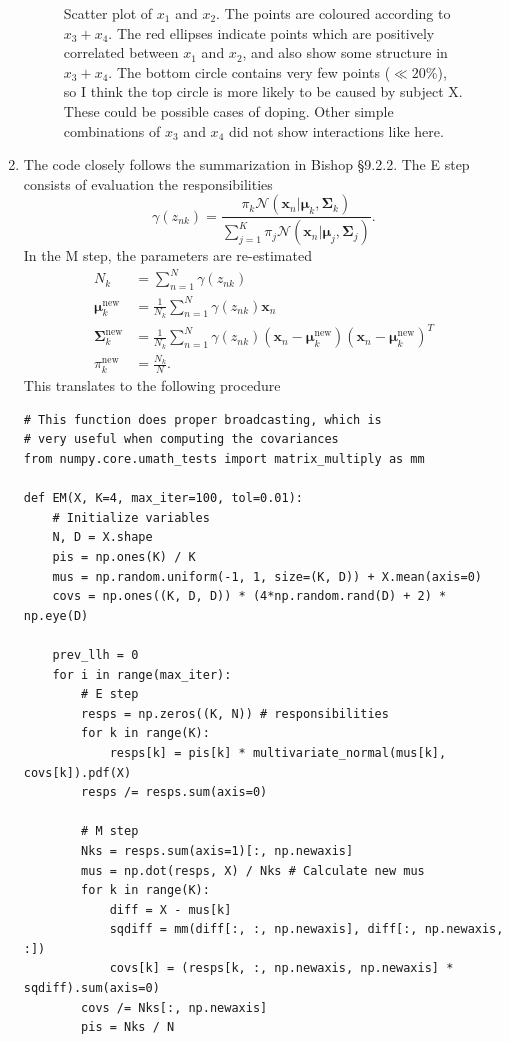 \documentclass[a4paper]{article}
\begin{document}
\begin{enumerate}
\begin{figure}[H]
\caption{Scatter plot of $x_1$ and $x_2$. The points are coloured according to $x_3 + x_4$. The red ellipses indicate points which are positively correlated between $x_1$ and $x_2$, and also show some structure in $x_3 + x_4$. The bottom circle contains very few points ($\ll20\%$), so I think the top circle is more likely to be caused by subject X. These could be possible cases of doping. Other simple combinations of $x_3$ and $x_4$ did not show interactions like here.}
\label{fig:scatter}
\end{figure}
\item 
The code closely follows the summarization in Bishop \S9.2.2. The E step consists of evaluation the responsibilities
\begin{equation}
\gamma(z_{nk}) = \frac{\pi_k\mathcal{N}(\bm{x}_n|\bm{\mu}_k,\bm{\Sigma}_k)}{\sum_{j=1}^K\pi_j\mathcal{N}(\bm{x}_n|\bm{\mu}_j,\bm{\Sigma}_j)}.
\end{equation}
In the M step, the parameters are re-estimated
\begin{align}
N_k &= \sum_{n=1}^N\gamma(z_{nk}) \\
\bm{\mu}_k^{\text{new}}&=\frac{1}{N_k}\sum_{n=1}^N\gamma(z_{nk})\bm{x}_n\\
\bm{\Sigma}_k^{\text{new}} &= \frac{1}{N_k}\sum_{n=1}^N\gamma(z_{nk})(\bm{x}_n - \bm{\mu}_k^{\text{new}})(\bm{x}_n - \bm{\mu}_k^{\text{new}})^T \\
\pi_k^{\text{new}} &= \frac{N_k}{N}.
\end{align}
This translates to the following procedure
\begin{lstlisting}
# This function does proper broadcasting, which is
# very useful when computing the covariances
from numpy.core.umath_tests import matrix_multiply as mm

def EM(X, K=4, max_iter=100, tol=0.01):
    # Initialize variables
    N, D = X.shape
    pis = np.ones(K) / K
    mus = np.random.uniform(-1, 1, size=(K, D)) + X.mean(axis=0)
    covs = np.ones((K, D, D)) * (4*np.random.rand(D) + 2) * np.eye(D)
    
    prev_llh = 0
    for i in range(max_iter):
        # E step
        resps = np.zeros((K, N)) # responsibilities
        for k in range(K):
            resps[k] = pis[k] * multivariate_normal(mus[k], covs[k]).pdf(X)
        resps /= resps.sum(axis=0)
        
        # M step
        Nks = resps.sum(axis=1)[:, np.newaxis]
        mus = np.dot(resps, X) / Nks # Calculate new mus
        for k in range(K):
            diff = X - mus[k]
            sqdiff = mm(diff[:, :, np.newaxis], diff[:, np.newaxis, :])
            covs[k] = (resps[k, :, np.newaxis, np.newaxis] * sqdiff).sum(axis=0)
        covs /= Nks[:, np.newaxis]
        pis = Nks / N
        

\end{lstlisting}
\end{enumerate}
\end{document}
